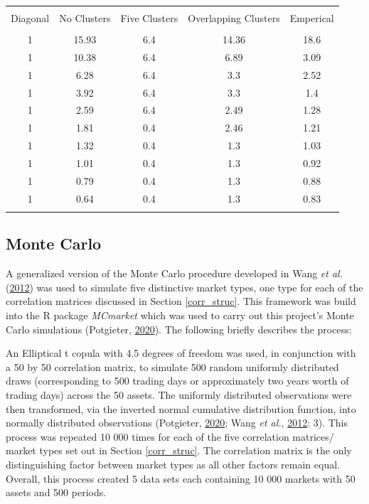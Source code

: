 \documentclass[11pt,preprint, authoryear]{elsarticle}
\let\origtable\table
\let\endorigtable\endtable
\renewenvironment{table}[1][2] {
    \expandafter\origtable\expandafter[H]
} {
    \endorigtable
}
\numberwithin{equation}{section}
\numberwithin{figure}{section}
\numberwithin{table}{section}
\begin{document}
\begin{table}[!htbp] \centering 
  \caption{Eigenvalues} 
  \label{eigens} 
\begin{tabular}{@{\extracolsep{5pt}} ccccc} 
\\[-1.8ex]\hline 
\hline \\[-1.8ex] 
Diagonal & No Clusters & Five Clusters & Overlapping Clusters & Emperical \\ 
\hline \\[-1.8ex] 
1 & 15.93 & 6.4 & 14.36 & 18.6 \\ 
1 & 10.38 & 6.4 & 6.89 & 3.09 \\ 
1 & 6.28 & 6.4 & 3.3 & 2.52 \\ 
1 & 3.92 & 6.4 & 3.3 & 1.4 \\ 
1 & 2.59 & 6.4 & 2.49 & 1.28 \\ 
1 & 1.81 & 0.4 & 2.46 & 1.21 \\ 
1 & 1.32 & 0.4 & 1.3 & 1.03 \\ 
1 & 1.01 & 0.4 & 1.3 & 0.92 \\ 
1 & 0.79 & 0.4 & 1.3 & 0.88 \\ 
1 & 0.64 & 0.4 & 1.3 & 0.83 \\ 
\hline \\[-1.8ex] 
\end{tabular} 
\end{table}

\hypertarget{monte-carlo}{%
\subsection{\texorpdfstring{Monte Carlo
\label{mc}}{Monte Carlo }}\label{monte-carlo}}

A generalized version of the Monte Carlo procedure developed in Wang
\emph{et al.} (\protect\hyperlink{ref-wang2012}{2012}) was used to
simulate five distinctive market types, one type for each of the
correlation matrices discussed in Section \ref{corr_struc}. This
framework was build into the R package \emph{MCmarket} which was used to
carry out this project's Monte Carlo simulations (Potgieter,
\protect\hyperlink{ref-MCmarket}{2020}). The following briefly describes
the process:

An Elliptical t copula with 4.5 degrees of freedom was used, in
conjunction with a 50 by 50 correlation matrix, to simulate 500 random
uniformly distributed draws (corresponding to 500 trading days or
approximately two years worth of trading days) across the 50 assets. The
uniformly distributed observations were then transformed, via the
inverted normal cumulative distribution function, into normally
distributed observations (Potgieter,
\protect\hyperlink{ref-MCmarket}{2020}; Wang \emph{et al.},
\protect\hyperlink{ref-wang2012}{2012}: 3). This process was repeated 10
000 times for each of the five correlation matrices/ market types set
out in Section \ref{corr_struc}. The correlation matrix is the only
distinguishing factor between market types as all other factors remain
equal. Overall, this process created 5 data sets each containing 10 000
markets with 50 assets and 500 periods.
\end{document}
